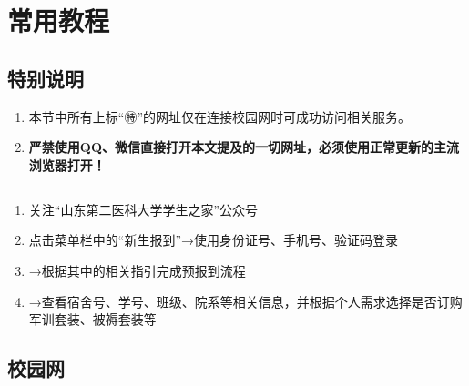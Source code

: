 \section[常用教程]{常用教程}

\subsection*{特别说明}
\begin{enumerate}
    \item 本节中所有上标“㊕”的网址仅在连接校园网时可成功访问相关服务。
    \item \textbf{严禁使用QQ、微信直接打开本文提及的一切网址，必须使用正常更新的主流浏览器打开！}
\end{enumerate}

\subsection[新生信息查询]{}
\label{freshman_query}
\begin{enumerate}
    \item 关注“山东第二医科大学学生之家”公众号
    \item 点击菜单栏中的“新生报到”→使用身份证号、手机号、验证码登录
    \item →根据其中的相关指引完成预报到流程
    \item →查看宿舍号、学号、班级、院系等相关信息，并根据个人需求选择是否订购军训套装、被褥套装\footnotemark 等
\end{enumerate}

\subsection[校园网]{校园网}
